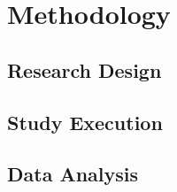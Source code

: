 \section{Methodology} \label{sec:methodology}

\subsection{Research Design} \label{ssec:research_design}

\subsection{Study Execution} \label{ssec:study_execution}

\subsection{Data Analysis} \label{ssec:data_analysis}
